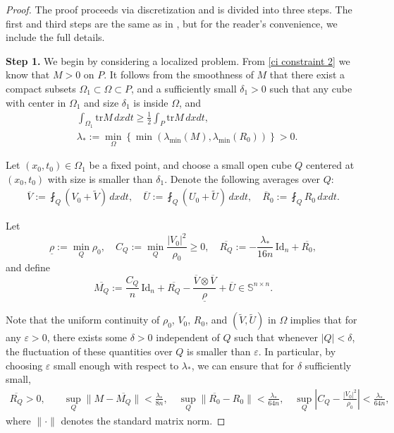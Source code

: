 \documentclass[12pt,reqno]{amsart}
\theoremstyle{definition}
\theoremstyle{remark}
\numberwithin{equation}{section}
\newcommand{\id}{\mathrm{Id}}
\newcommand{\trace}{\mathrm{tr}}
\begin{document}
\begin{proof}

The proof proceeds via discretization and is divided into three steps. The first and third steps are the same as in \cite[Lemma 3.2]{CVY}, but for the reader's convenience, we include the full details.


{\bf Step 1. }
We begin by considering a localized problem. From \eqref{ci constraint 2} we know that $M > 0$ on $P$. It follows from the smoothness of $M$ that there exist a compact subsets $\Omega_1 \subset \Omega \subset P$, and a sufficiently small $\delta_1 > 0$ such that any cube with center in $\Omega_1$ and size $\delta_1$ is inside $\Omega$, and
\begin{align*}
& \int_{\Omega_1} \trace M \,dxdt \ge \frac12 \int_{P} \trace M \,dxdt, \\
& \lambda_\ast := \min_{\Omega} \left\{ \min( \lambda_{\min}(M), \lambda_{\min}(R_0) ) \right\} > 0. 
\end{align*}

Let $ (x_0, t_0) \in \Omega_1 $ be a fixed point, and choose a small open cube $ Q $ centered at $ (x_0, t_0) $ with size is smaller than $ \delta_1 $. Denote the following averages over $ Q $:
\begin{equation}\label{averages}
\begin{split}
\overline V := \fint_Q (V_0+\widetilde V)\,dxdt, \quad \overline U := \fint_Q (U_0+\widetilde U)\,dxdt, \quad \overline R_0 :=   \fint_Q R_0\,dxdt.
\end{split}
\end{equation}

Let
\begin{equation}\label{def_C_Q}
\underline{\rho} := \min_Q \rho_0, \quad 
C_Q := \min_Q \frac{|V_0|^2}{\rho_0} \geq 0, \quad 
\overline{R_Q} := -\frac{\lambda_*}{16n} \, \id_n + \overline{R_0},
\end{equation}
and define 
\begin{equation}\label{def_M_Q}
\overline{M_Q} := \frac{C_Q}{n} \, \id_n + \overline{R_Q} - \frac{\overline{V} \otimes \overline{V}}{\underline{\rho}} + \overline{U} \in \mathbb{S}^{n \times n}.
\end{equation}

Note that the uniform continuity of $ \rho_0 $, $ V_0 $, $ R_0 $, and $ (\widetilde{V}, \widetilde{U}) $ in $ \Omega $ implies that for any $ \varepsilon > 0 $, there exists some $ \delta > 0 $ independent of $ Q $ such that whenever $ |Q| < \delta $, the fluctuation of these quantities over $ Q $ is smaller than $ \varepsilon $. In particular, by choosing $ \varepsilon $ small enough with respect to $ \lambda_* $, we can ensure that for $ \delta $ sufficiently small,
\begin{equation*}
\begin{split}
\overline{R_Q} > 0, &\quad 
\sup_Q \| M - \overline{M_Q} \| < \frac{\lambda_*}{8n}, \quad
\sup_Q \| \overline{R_0} - R_0 \| < \frac{\lambda_*}{64n}, \quad 
\sup_Q \left| C_Q - \frac{|V_0|^2}{\rho_0} \right| < \frac{\lambda_*}{64n},
\end{split}
\end{equation*}
where $ \|\cdot\| $ denotes the standard matrix norm.


\end{proof}
\end{document}
